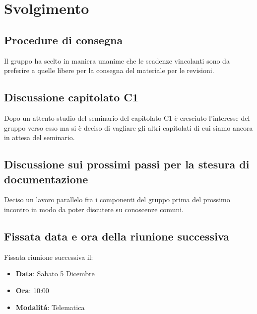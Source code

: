 \documentclass[]{article}
\begin{document}
	\newpage
	
	\section{Svolgimento}
	\subsection{Procedure di consegna}
	Il gruppo ha scelto in maniera unanime che le scadenze vincolanti sono da preferire a quelle libere per la consegna del materiale per le revisioni.\\
	
	\subsection{Discussione capitolato C1}
	Dopo un attento studio del seminario del capitolato C1 è cresciuto l'interesse del gruppo verso esso ma si è deciso di vagliare gli altri capitolati di cui siamo ancora in attesa del seminario. 
	
	\subsection{Discussione sui prossimi passi per la stesura di documentazione}
	Deciso un lavoro parallelo fra i componenti del gruppo prima del
	prossimo incontro in modo da poter discutere su conoscenze comuni.\\
	
	\subsection{Fissata data e ora della riunione successiva}
	Fissata riunione successiva il:
	\begin{itemize}
		\item \textbf{Data}: Sabato 5 Dicembre
		\item \textbf{Ora}: 10:00
		\item \textbf{Modalitá}: Telematica
	\end{itemize}
	

	
\end{document}
